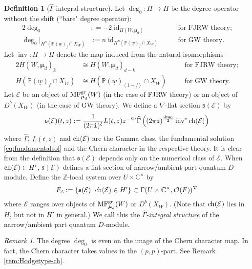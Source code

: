\documentclass[11pt]{amsart}
\theoremstyle{definition} %
\newtheorem{defn}[thm]{Definition} %
\theoremstyle{remark} %
\newtheorem{rem}[thm]{Remark}%
\newcommand{\CC}{\mathbb C}
\newcommand{\PP}{\mathbb P}
\newcommand{\ZZ}{\mathbb Z}
\newcommand{\id}{\operatorname{id}}
\newcommand{\ch}{{\rm ch}}
\def\MFhom{\operatorname{{MF}}}
\def\fracp#1{\left\langle #1 \right\rangle}
\newcommand{\bmu}{\boldsymbol{\mu}}
\newcommand{\cO}{\mathcal{O}}
\newcommand{\cE}{\mathcal{E}}
\newcommand{\frs}{\mathfrak{s}}
\newcommand{\hc}{\hat{c}}
\newcommand{\grading}{\operatorname{\mathsf{Gr}}} %
\newcommand{\inv}{\operatorname{inv}}
\newcommand{\hGamma}{\widehat{\Gamma}}
\newcommand{\iu}{\mathtt{i}}
\newcommand{\uw}{\underline{w}}
\begin{document}
\begin{defn}[$\hGamma$-integral structure] 
\label{defn:intstr} 
Let $\deg_0 \colon H \to H$ be the degree operator 
without the shift (``bare" degree operator): 
\begin{alignat*}{2}
\deg_0 &: = -2 \id_{H(W,\bmu_d)} 
& \quad & \text{for FJRW theory;}   \\ 
\deg_0|_{H^{n}(\PP(\uw)_f\cap X_W)} 
& := n \id_{H^{n}(\PP(\uw)_f \cap X_W)} 
& & \text{for GW theory.} 
\end{alignat*} 
Let $\inv \colon H \to H$ denote the map induced 
from the natural isomorphisms 
\begin{alignat*}{2} 
H(W,\bmu_d)_k & \cong H(W,\bmu_d)_{d-k} 
& \quad &\text{for FJRW theory;} \\ 
H(\PP(\uw)_f \cap X_W) &\cong 
H(\PP(\uw)_{\fracp{1-f}} \cap X_W) 
&  & \text{for GW theory.} 
\end{alignat*} 
Let $\cE$ be an object of $\MFhom^{\rm gr}_{\bmu_d}(W)$ 
(in the case of FJRW theory) or 
an object of $D^b(X_W)$ (in the case of GW theory). 
We define a $\nabla$-flat section $\frs(\cE)$ by 
\begin{equation} 
\label{eq:K-framing} 
\frs(\cE)(t,z) := \frac{1}{(2\pi\iu)^{\hc}} 
L(t,z) z^{-\grading}  \hGamma 
\left((2\pi\iu)^{\frac{\deg_0}{2}}  \inv^* \ch(\cE) \right)    
\end{equation} 
where $\hGamma$, $L(t,z)$ and $\ch(\cE)$ are 
the Gamma class, the fundamental solution \eqref{eq:fundamentalsol} 
and the Chern character in the respective theory. 
It is clear from the definition that $\frs(\cE)$ depends 
only on the numerical class of $\cE$. 
When $\ch(\cE) \in H'$, $\frs(\cE)$ defines a 
flat section of narrow/ambient part quantum $D$-module. 
Define the $\ZZ$-local system over $U\times \CC^\times$ by 
\[
F_{\ZZ} := \{ \frs(\cE) \, |\, \ch(\cE) \in H'\}  
\subset \Gamma(U\times \CC^\times, \cO(F))^{\nabla}
\]
where $\cE$ ranges over objects of $\MFhom^{\rm gr}_{\bmu_d}(W)$ 
or $D^b(X_W)$. (Note that $\ch(\cE)$ lies in $H$, but
 not in $H'$ in general.)
We call this the \emph{$\hGamma$-integral structure} 
of the narrow/ambient part quantum $D$-module.   
\end{defn} 
\begin{rem} 
The degree $\deg_0$ is even on the image of the 
Chern character map. In fact, the Chern character 
takes values in the $(p,p)$-part. 
See Remark \ref{rem:Hodgetype-ch}. 
\end{rem} 
\end{document}
